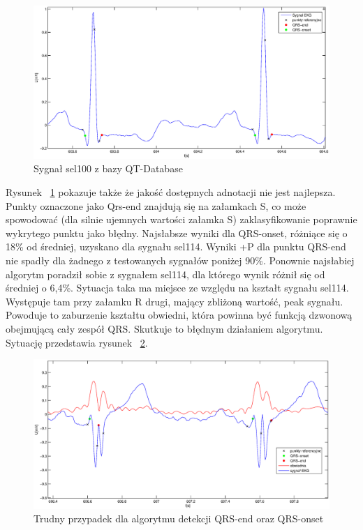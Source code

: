 \begin{figure}[h!]
\centering
\includegraphics[width=\textwidth,keepaspectratio] {Waves/img/sel100.eps}
\caption{Sygnał sel100 z bazy QT-Database}
\label{fig:Waves_sel100}
\end{figure}

Rysunek ~\ref{fig:Waves_sel100} pokazuje także że jakość dostępnych adnotacji nie jest najlepsza. Punkty oznaczone jako Qrs-end znajdują się na załamkach S, co może spowodować (dla silnie ujemnych wartości załamka S) zaklasyfikowanie poprawnie wykrytego punktu jako błędny.   
Najsłabsze wyniki dla QRS-onset, różniące się o 18\% od średniej, uzyskano dla sygnału sel114. Wyniki +P dla punktu QRS-end nie spadły dla żadnego z testowanych sygnałów poniżej 90\%. Ponownie najsłabiej algorytm poradził sobie z sygnałem sel114, dla którego wynik różnił się od średniej o 6,4\%. Sytuacja taka ma miejsce ze względu na kształt sygnału sel114.
Występuje tam przy załamku R drugi, mający zbliżoną wartość, peak sygnału. Powoduje to zaburzenie kształtu obwiedni, która powinna być funkcją dzwonową obejmującą cały zespół QRS. Skutkuje to błędnym działaniem algorytmu. Sytuację przedstawia rysunek ~\ref{fig:Waves_Error}.

\begin{figure}[h!]
\centering
\includegraphics[width=\textwidth,keepaspectratio] {Waves/img/Error.eps}
\caption{Trudny przypadek dla algorytmu detekcji QRS-end oraz QRS-onset}
\label{fig:Waves_Error}
\end{figure}

